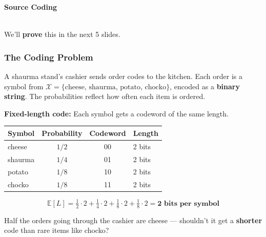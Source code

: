 \documentclass[aspectratio=169]{beamer}
\begin{document}
\begin{frame}
\begin{center}
\vspace{0.4cm}
{\LARGE\bfseries\textcolor{popblue}{Source Coding}}\\[15pt]
\\[10pt]
{\large We'll \textbf{prove} this in the next 5 slides.}
\end{center}
\end{frame}

\begin{frame}
\frametitle{The Coding Problem}

\small
A shaurma stand's cashier sends order codes to the kitchen. Each order is a symbol from $\mathcal{X} = \{\text{cheese, shaurma, potato, chocko}\}$, encoded as a \textbf{binary string}. The probabilities reflect how often each item is ordered.

\vspace{0.15cm}
\textbf{Fixed-length code:} Each symbol gets a codeword of the same length.

\vspace{0.1cm}
\begin{center}
\renewcommand{\arraystretch}{1.4}
\begin{tabular}{lccl}
  \textbf{Symbol} & \textbf{Probability} & \textbf{Codeword} & \textbf{Length} \\
  \hline
  cheese  & $1/2$ & 00 & 2 bits \\
  shaurma & $1/4$ & 01 & 2 bits \\
  potato  & $1/8$ & 10 & 2 bits \\
  chocko  & $1/8$ & 11 & 2 bits \\
  \hline
\end{tabular}
\end{center}

$$\mathbb{E}[L] = \tfrac{1}{2}\cdot 2 + \tfrac{1}{4}\cdot 2 + \tfrac{1}{8}\cdot 2 + \tfrac{1}{8}\cdot 2 = \textbf{2 bits per symbol}$$

\vspace{0.05cm}
\begin{center}
\small Half the orders going through the cashier are cheese --- shouldn't it get a \textbf{shorter} code than rare items like chocko?
\end{center}
\end{frame}
\end{document}
